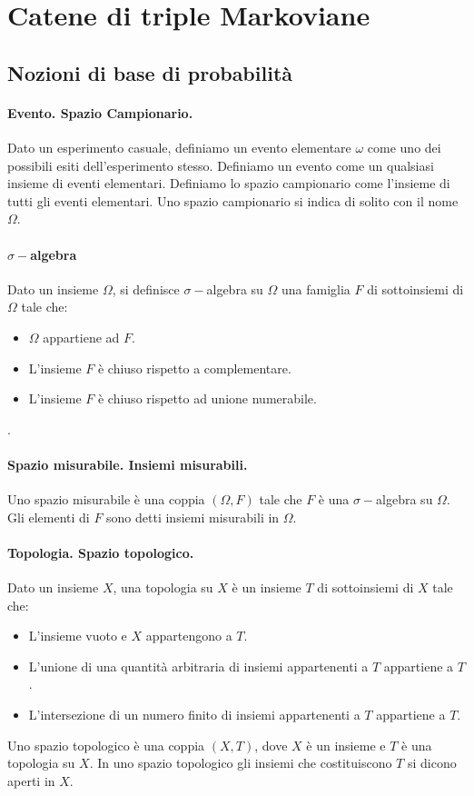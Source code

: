 \section{Catene di triple Markoviane}
\label{markov}
\subsection{Nozioni di base di probabilit\`a}

\paragraph{Evento. Spazio Campionario.}Dato un esperimento casuale, definiamo un evento elementare $\omega$ come uno dei possibili esiti dell'esperimento stesso. Definiamo un evento come un qualsiasi insieme di eventi elementari. Definiamo lo spazio campionario come l'insieme di tutti gli eventi elementari. Uno spazio campionario si indica di solito con il nome $\Omega$.

\paragraph{$\sigma-$algebra}
Dato un insieme $\Omega$, si definisce $\sigma-$algebra su $\Omega$ una famiglia $F$ di sottoinsiemi di $\Omega$ tale che:
\begin{itemize}
  \item 
    $\Omega$ appartiene ad $F$.
  \item
    L'insieme $F$ \`e chiuso rispetto a complementare.
  \item
    L'insieme $F$ \`e chiuso rispetto ad unione numerabile.
\end{itemize}.

\paragraph{Spazio misurabile. Insiemi misurabili.}
Uno spazio misurabile \`e una coppia $(\Omega, F)$ tale che $F$ \`e una $\sigma-$algebra su $\Omega$. Gli elementi di $F$ sono detti insiemi misurabili in $\Omega$.

\paragraph{Topologia. Spazio topologico.}
Dato un insieme $X$, una topologia su $X$ \`e un insieme $T$ di sottoinsiemi di $X$ tale che:
\begin{itemize}
  \item 
    L'insieme vuoto e $X$ appartengono a $T$.
  \item
    L'unione di una quantit\`a arbitraria di insiemi appartenenti a $T$ appartiene a $T$.
  \item
    L'intersezione di un numero finito di insiemi appartenenti a $T$ appartiene a $T$.
\end{itemize}
Uno spazio topologico \`e una coppia $(X, T)$, dove $X$ \`e un insieme e $T$ \`e una topologia su $X$. In uno spazio topologico gli insiemi che costituiscono $T$ si dicono aperti in $X$.

